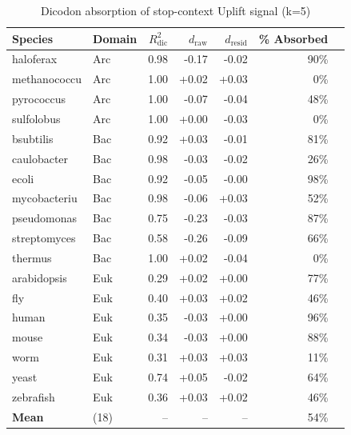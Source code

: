 
\begin{table}[htbp]
\centering
\caption{Dicodon absorption of stop-context Uplift signal (k=5)}
\label{tab:dicodon_absorption}
\begin{tabular}{llrrrrr}
\toprule
Species & Domain & $R^2_{\mathrm{dic}}$ & $d_{\mathrm{raw}}$ & $d_{\mathrm{resid}}$ & \% Absorbed \\
\midrule
haloferax & Arc & 0.98 & -0.17 & -0.02 & 90\% \\
methanococcu & Arc & 1.00 & +0.02 & +0.03 & 0\% \\
pyrococcus & Arc & 1.00 & -0.07 & -0.04 & 48\% \\
sulfolobus & Arc & 1.00 & +0.00 & -0.03 & 0\% \\
bsubtilis & Bac & 0.92 & +0.03 & -0.01 & 81\% \\
caulobacter & Bac & 0.98 & -0.03 & -0.02 & 26\% \\
ecoli & Bac & 0.92 & -0.05 & -0.00 & 98\% \\
mycobacteriu & Bac & 0.98 & -0.06 & +0.03 & 52\% \\
pseudomonas & Bac & 0.75 & -0.23 & -0.03 & 87\% \\
streptomyces & Bac & 0.58 & -0.26 & -0.09 & 66\% \\
thermus & Bac & 1.00 & +0.02 & -0.04 & 0\% \\
arabidopsis & Euk & 0.29 & +0.02 & +0.00 & 77\% \\
fly & Euk & 0.40 & +0.03 & +0.02 & 46\% \\
human & Euk & 0.35 & -0.03 & +0.00 & 96\% \\
mouse & Euk & 0.34 & -0.03 & +0.00 & 88\% \\
worm & Euk & 0.31 & +0.03 & +0.03 & 11\% \\
yeast & Euk & 0.74 & +0.05 & -0.02 & 64\% \\
zebrafish & Euk & 0.36 & +0.03 & +0.02 & 46\% \\
\midrule
\textbf{Mean} & (18) & -- & -- & -- & 54\% \\
\bottomrule
\end{tabular}
\end{table}